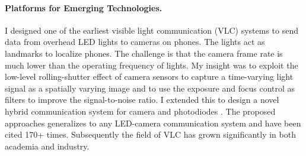 \documentclass[10pt]{article}
\begin{document}

\paragraph{Platforms for Emerging Technologies. }
I designed one of the earliest visible light communication (VLC) systems to send data from overhead LED lights to cameras on phones. The lights act as landmarks to localize phones. The challenge is that the camera frame rate is much lower than the operating frequency of lights. 
My insight was to exploit the low-level rolling-shutter effect of camera sensors to capture a time-varying light signal as a spatially varying image \cite{rajagopal2014visual, rajagopal2014demonstration} and to use the exposure and focus control as filters to improve the signal-to-noise ratio. I extended this to design a novel hybrid communication system for camera and photodiodes \cite{rajagopal2014hybrid}. 
The proposed approaches generalizes to any LED-camera communication system and have been cited 170+ times. Subsequently the field of VLC has grown significantly in both academia and industry.
\end{document}
